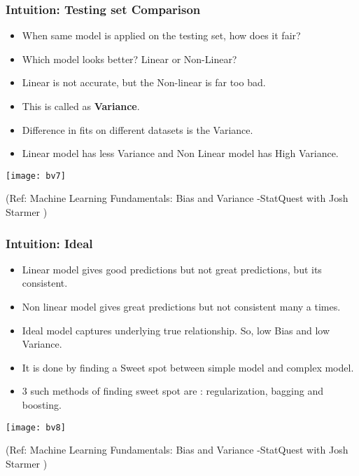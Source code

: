 \begin{frame}[fragile]\frametitle{Intuition: Testing set Comparison}
	\begin{itemize}
	\item When same model is applied on the testing set, how does it fair?
	\item Which model looks better? Linear or Non-Linear?
	\item Linear is not accurate, but the Non-linear is far too bad.
	\item This is called as {\bf Variance}.
	\item Difference in fits on different datasets is the Variance.
	\item Linear model has less Variance and Non Linear model has High Variance.
	\end{itemize}
	
\begin{center}
\texttt{[image: bv7]}
\end{center}
	
\tiny{(Ref: Machine Learning Fundamentals: Bias and Variance -StatQuest with Josh Starmer )}
\end{frame}

\begin{frame}[fragile]\frametitle{Intuition: Ideal}
	\begin{itemize}
	\item Linear model gives good predictions but not great predictions, but its consistent.
	\item Non linear model gives great predictions but not consistent many a times.
	\item Ideal model captures underlying true relationship. So, low Bias and low Variance.
	\item It is done by finding a Sweet spot between simple model and complex model.
	\item 3 such methods of finding sweet spot are : regularization, bagging and boosting.
	\end{itemize}
	
\begin{center}
\texttt{[image: bv8]}
\end{center}
	
\tiny{(Ref: Machine Learning Fundamentals: Bias and Variance -StatQuest with Josh Starmer )}
\end{frame}



